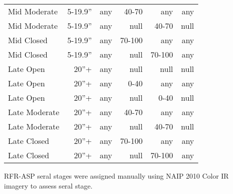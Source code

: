 \begin{table}[hbp]
\begin{tabular}{@{}lrrrrr@{}}
Mid Moderate     & 5-19.9''        & any & 40-70  & any    & any  \\
Mid Moderate     & 5-19.9''        & any & null   & 40-70  & null \\
Mid Closed       & 5-19.9''        & any & 70-100 & any    & any  \\
Mid Closed       & 5-19.9''        & any & null   & 70-100 & any  \\
Late Open        & 20''+           & any & null   & null   & null \\
Late Open        & 20''+           & any & 0-40   & any    & any  \\
Late Open        & 20''+           & any & null   & 0-40   & null \\
Late Moderate    & 20''+           & any & 40-70  & any    & any  \\
Late Moderate    & 20''+           & any & null   & 40-70  & null \\
Late Closed      & 20''+           & any & 70-100 & any    & any  \\
Late Closed      & 20''+           & any & null   & 70-100 & any  \\ \bottomrule
\end{tabular}
\end{table}

RFR-ASP seral stages were assigned manually using NAIP 2010 Color IR imagery to assess seral stage.



\clearpage

